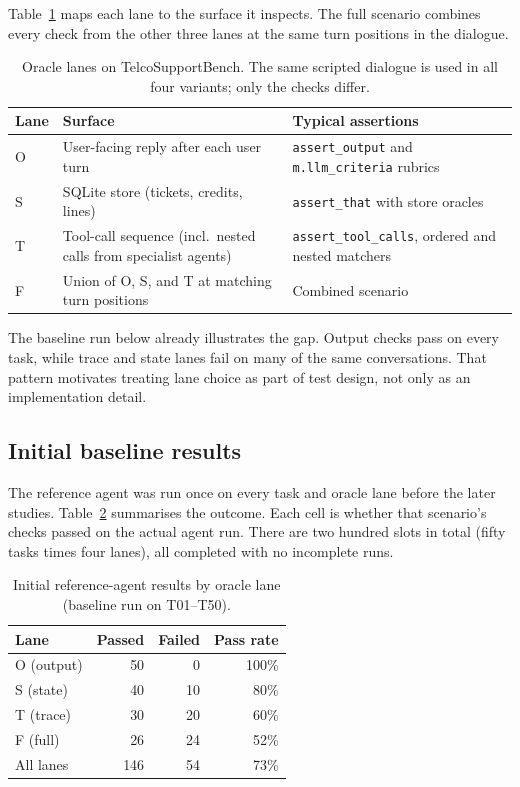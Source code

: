 Table~\ref{tab:oracle-lanes} maps each lane to the surface it inspects. The full scenario combines every check from the other three lanes at the same turn positions in the dialogue.

\begin{table}[htbp]
\centering
\caption{Oracle lanes on TelcoSupportBench. The same scripted dialogue is used in all four variants; only the checks differ.}
\label{tab:oracle-lanes}
\begin{tabular}{@{}ll>{\raggedright\arraybackslash}p{6.8cm}@{}}
\toprule
Lane & Surface & Typical assertions \\
\midrule
O & User-facing reply after each user turn & \texttt{assert\_output} and \texttt{m.llm\_criteria} rubrics \\
S & SQLite store (tickets, credits, lines) & \texttt{assert\_that} with store oracles \\
T & Tool-call sequence (incl.\ nested calls from specialist agents) & \texttt{assert\_tool\_calls}, ordered and nested matchers \\
F & Union of O, S, and T at matching turn positions & Combined scenario \\
\bottomrule
\end{tabular}
\end{table}

The baseline run below already illustrates the gap. Output checks pass on every task, while trace and state lanes fail on many of the same conversations. That pattern motivates treating lane choice as part of test design, not only as an implementation detail.

\subsection{Initial baseline results}

The reference agent was run once on every task and oracle lane before the later studies. Table~\ref{tab:baseline-initial} summarises the outcome. Each cell is whether that scenario's checks passed on the actual agent run. There are two hundred slots in total (fifty tasks times four lanes), all completed with no incomplete runs.

\begin{table}[htbp]
\centering
\caption{Initial reference-agent results by oracle lane (baseline run on T01--T50).}
\label{tab:baseline-initial}
\begin{tabular}{@{}lrrr@{}}
\toprule
Lane & Passed & Failed & Pass rate \\
\midrule
O (output) & 50 & 0 & 100\% \\
S (state) & 40 & 10 & 80\% \\
T (trace) & 30 & 20 & 60\% \\
F (full) & 26 & 24 & 52\% \\
\midrule
All lanes & 146 & 54 & 73\% \\
\bottomrule
\end{tabular}
\end{table}

